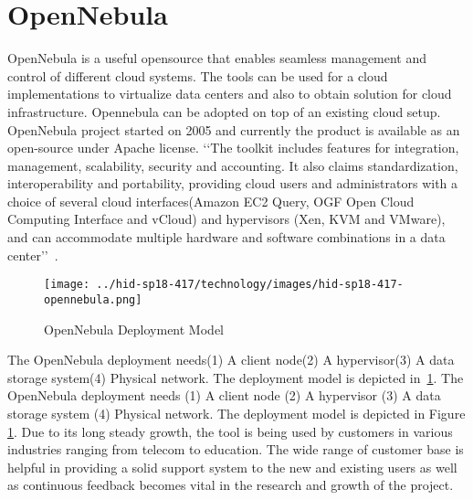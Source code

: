 
\section{OpenNebula}
OpenNebula is a useful opensource that enables seamless management and
control of different cloud systems.  The tools can be used for a cloud
implementations to virtualize data centers and also to obtain solution
for cloud infrastructure.  Opennebula can be adopted on top of an
existing cloud setup.  OpenNebula project started on 2005 and
currently the product is available as an open-source under Apache
license.
‘‘The toolkit includes features for integration, management,
scalability, security and accounting.  It also claims standardization,
interoperability and portability, providing cloud users and
administrators with a choice of several cloud interfaces(Amazon EC2
Query, OGF Open Cloud Computing Interface and vCloud) and hypervisors
(Xen, KVM and VMware), and can accommodate multiple hardware and
software combinations in a data center’’~\cite{hid-sp18-417-opennebula-wiki}.
\begin{figure}[htb]
\texttt{[image: ../hid-sp18-417/technology/images/hid-sp18-417-opennebula.png]}
\caption{OpenNebula Deployment Model~\cite{hid-sp18-417-opennebula-deployment}} 
\label{F:opennebula}
\end{figure}
The OpenNebula deployment needs(1) A client node(2) A hypervisor(3)
A data storage system(4) Physical network. The deployment model is
depicted in~\ref{F:opennebula}.
The OpenNebula deployment needs (1) A client node (2) A hypervisor (3)
A data storage system (4) Physical network. The deployment model is
depicted in Figure \ref{F:opennebula}.
Due to its long steady growth, the tool is being used by customers in
various industries ranging from telecom to education.  The wide range
of customer base is helpful in providing a solid support system to the
new and existing users as well as continuous feedback becomes vital in
the research and growth of the project.
